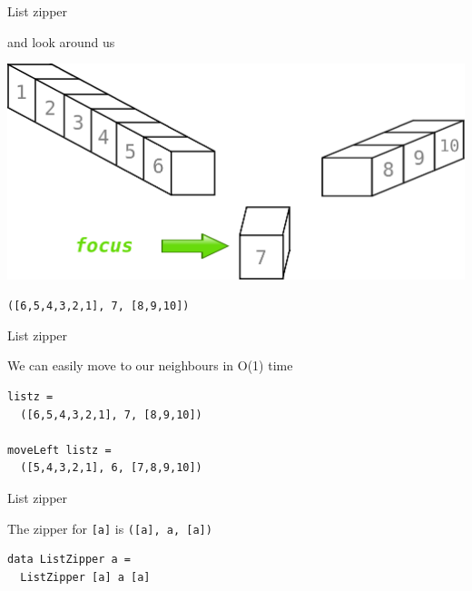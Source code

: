 \begin{frame}
\begin{block}{List zipper}
\begin{center}
and look around us
\end{center}
\end{block}
\begin{center}
\includegraphics[width=1.25\textheight]{image/listzipper1-10-focus.png}
\end{center}
\begin{center}
\lstinline{([6,5,4,3,2,1], 7, [8,9,10])}
\end{center}
\end{frame}

\begin{frame}[fragile]
\begin{block}{List zipper}
\begin{center}
We can easily move to our neighbours in O(1) time
\end{center}
\end{block}
\begin{center}
\begin{lstlisting}[style=haskell]
listz =
  ([6,5,4,3,2,1], 7, [8,9,10])
  
moveLeft listz =
  ([5,4,3,2,1], 6, [7,8,9,10])
\end{lstlisting}
\end{center}
\end{frame}

\begin{frame}[fragile]
\begin{block}{List zipper}
\begin{center}
The zipper for \lstinline{[a]} is \lstinline{([a], a, [a])}
\end{center}
\end{block}
\begin{center}
\begin{lstlisting}[style=haskell]
data ListZipper a =
  ListZipper [a] a [a]
\end{lstlisting}
\end{center}
\end{frame}

